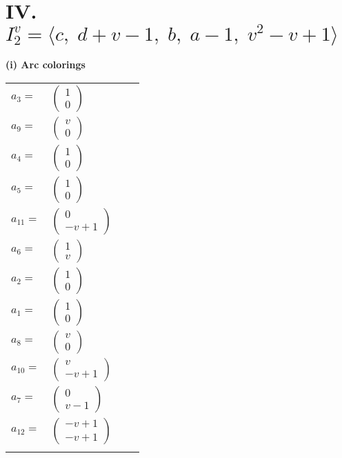 \documentclass[1p]{elsarticle_modified}
\theoremstyle{definition}
\begin{document}
\centering \section*{IV. $I^v_{2}= \langle c,\;d+v-1,\;b,\;a-1,\;v^2- v+1 \rangle$}
\flushleft \textbf{(i) Arc colorings}\\
\begin{tabular}{m{7pt} m{180pt} m{7pt} m{180pt} }
\flushright $a_{3}=$&$\begin{pmatrix}1\\0\end{pmatrix}$ \\
\flushright $a_{9}=$&$\begin{pmatrix}v\\0\end{pmatrix}$ \\
\flushright $a_{4}=$&$\begin{pmatrix}1\\0\end{pmatrix}$ \\
\flushright $a_{5}=$&$\begin{pmatrix}1\\0\end{pmatrix}$ \\
\flushright $a_{11}=$&$\begin{pmatrix}0\\- v+1\end{pmatrix}$ \\
\flushright $a_{6}=$&$\begin{pmatrix}1\\v\end{pmatrix}$ \\
\flushright $a_{2}=$&$\begin{pmatrix}1\\0\end{pmatrix}$ \\
\flushright $a_{1}=$&$\begin{pmatrix}1\\0\end{pmatrix}$ \\
\flushright $a_{8}=$&$\begin{pmatrix}v\\0\end{pmatrix}$ \\
\flushright $a_{10}=$&$\begin{pmatrix}v\\- v+1\end{pmatrix}$ \\
\flushright $a_{7}=$&$\begin{pmatrix}0\\v-1\end{pmatrix}$ \\
\flushright $a_{12}=$&$\begin{pmatrix}- v+1\\- v+1\end{pmatrix}$\\&\end{tabular}
\end{document}

